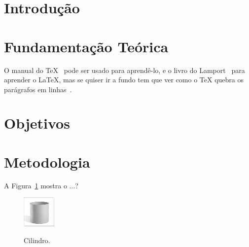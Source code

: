 \documentclass[]{preppgca}
\begin{document}
\data{\today}



\maketitle

\begin{resumo}

  \lipsum[1]
  
\end{resumo}

\section*{Introdução}
\label{intro}

\lipsum[2-3]

\section{Fundamentação Teórica}

\lipsum[4-5]

O manual do \TeX~\cite{knuth1986} pode ser usado para aprendê-lo, e o
livro do Lamport~\cite{lamport1994} para aprender o
\LaTeX{}, mas se quiser ir a fundo tem que ver como o \TeX
quebra os parágrafos em linhas~\cite{knuth1981}.

\section{Objetivos}

\lipsum[6]

\section{Metodologia}

\lipsum[7]

A Figura~\ref{fig:cilindro} mostra o $\ldots$?

\begin{figure}[ht]
  \caption{Cilindro.}
  \centering
  \includegraphics{cilindro.png} 
  \label{fig:cilindro}
\end{figure}
\end{document}

